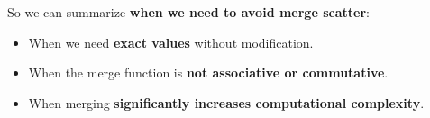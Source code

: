 So we can summarize \textbf{when we need to avoid merge scatter}:
\begin{itemize}[label=\textcolor{Red2}{}]
    \item When we need \textcolor{Red2}{\textbf{exact values}} without modification.
    \item When the merge function is \textcolor{Red2}{\textbf{not associative or commutative}}.
    \item When merging \textcolor{Red2}{\textbf{significantly increases computational complexity}}.
\end{itemize}